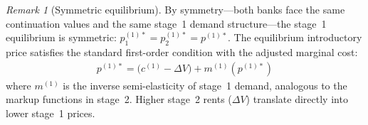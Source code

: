 \documentclass[12pt]{article}
\theoremstyle{plain}
\theoremstyle{plain}
\theoremstyle{definition}  %
\theoremstyle{remark}  %
\newtheorem{remark}[thm]{Remark}  %
\begin{document}
\begin{remark}[Symmetric equilibrium]
By symmetry---both banks face the same continuation values and the same stage~1 demand structure---the stage~1 equilibrium is symmetric: $p_1^{(1)*} = p_2^{(1)*} = p^{(1)*}$. The equilibrium introductory price satisfies the standard first-order condition with the adjusted marginal cost:
\begin{align}\label{eq:p1_foc}
    p^{(1)*} = \big(c^{(1)} - \Delta V\big) + m^{(1)}(p^{(1)*})
\end{align}
where $m^{(1)}$ is the inverse semi-elasticity of stage~1 demand, analogous to the markup functions in stage~2. Higher stage~2 rents ($\Delta V$) translate directly into lower stage~1 prices.
\end{remark}
\end{document}
